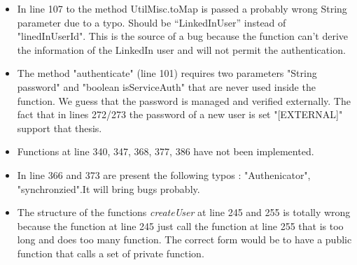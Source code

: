 
\begin{itemize}
\item In line 107 to the method UtilMisc.toMap is passed a probably wrong String parameter due to a typo. Should be “LinkedInUser” instead of "linedInUserId". This is the source of a bug because the function can't derive the information of the LinkedIn user and will not permit the authentication.

\item The method "authenticate" (line 101) requires two parameters "String password" and "boolean isServiceAuth" that are never used inside the function. We guess that the password is managed and verified externally. The fact that in lines 272/273 the password of a new user is set "[EXTERNAL]" support that thesis.

\item Functions at line  340, 347, 368, 377, 386 have not been implemented.

\item In line 366 and 373 are present the following typos : "Authenicator", "synchronzied".It  will bring bugs probably.

\item The structure of the  functions \textit{createUser} at line 245 and 255 is totally wrong because the function at line  245 just call the function at line 255 that is too long and does too many function. The correct form would be to have a public function that calls a set of private function.

\end{itemize}